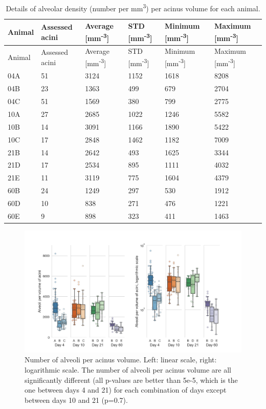 \documentclass[
  american,
]{article}
\begin{document}
\begin{longtable}[]{@{}llllll@{}}
\caption{Details of alveolar density (number per mm\textsuperscript{3}) per acinus volume for each animal. \label{tbl:density}}\tabularnewline
\toprule
Animal & Assessed acini & Average {[}mm\textsuperscript{-3}{]} & STD {[}mm\textsuperscript{-3}{]} & Minimum {[}mm\textsuperscript{-3}{]} & Maximum {[}mm\textsuperscript{-3}{]}\tabularnewline
\midrule
\endfirsthead
\toprule
Animal & Assessed acini & Average {[}mm\textsuperscript{-3}{]} & STD {[}mm\textsuperscript{-3}{]} & Minimum {[}mm\textsuperscript{-3}{]} & Maximum {[}mm\textsuperscript{-3}{]}\tabularnewline
\midrule
\endhead
04A & 51 & 3124 & 1152 & 1618 & 8208\tabularnewline
04B & 23 & 1363 & 499 & 679 & 2704\tabularnewline
04C & 51 & 1569 & 380 & 799 & 2775\tabularnewline
10A & 27 & 2685 & 1022 & 1246 & 5582\tabularnewline
10B & 14 & 3091 & 1166 & 1890 & 5422\tabularnewline
10C & 17 & 2848 & 1462 & 1182 & 7009\tabularnewline
21B & 14 & 2642 & 493 & 1625 & 3344\tabularnewline
21D & 17 & 2534 & 895 & 1111 & 4032\tabularnewline
21E & 11 & 3119 & 775 & 1604 & 4379\tabularnewline
60B & 24 & 1249 & 297 & 530 & 1912\tabularnewline
60D & 10 & 838 & 271 & 476 & 1221\tabularnewline
60E & 9 & 898 & 323 & 411 & 1463\tabularnewline
\bottomrule
\end{longtable}

\begin{figure}
\hypertarget{fig:05}{%
\centering
\includegraphics{images/fig05.png}
\caption{Number of alveoli per acinus volume.
Left: linear scale, right: logarithmic scale.
The number of alveoli per acinus volume are all significantly different (all p-values are better than 5e-5, which is the one between days 4 and 21) for each combination of days except between days 10 and 21 (p=0.7).}\label{fig:05}
}
\end{figure}
\end{document}
